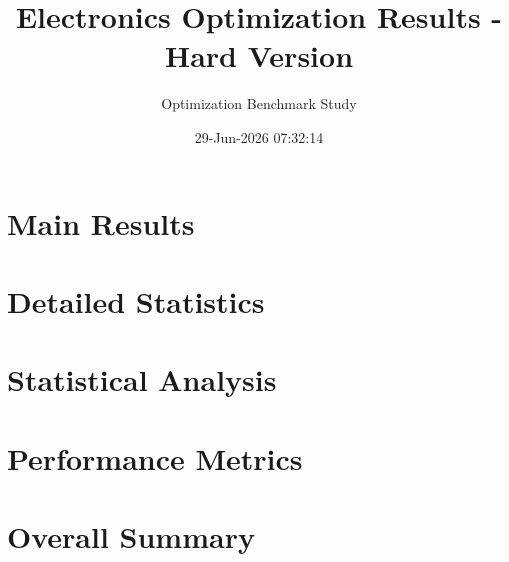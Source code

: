 \documentclass[12pt,a4paper]{article}
\begin{document}
\title{Electronics Optimization Results - Hard Version}
\author{Optimization Benchmark Study}
\date{29-Jun-2026 07:32:14}
\maketitle

\section{Main Results}



\section{Detailed Statistics}











\section{Statistical Analysis}







\section{Performance Metrics}





\section{Overall Summary}


\end{document}

